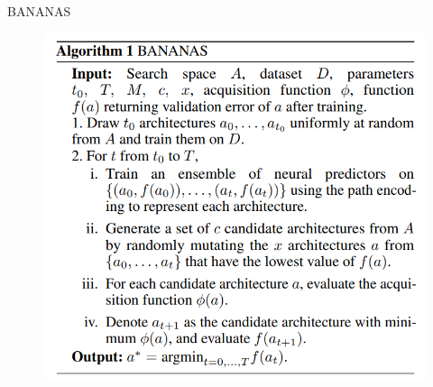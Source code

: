 \documentclass{beamer}
\begin{document}
\begin{frame}{BANANAS}
\centering 


\begin{figure}
        \centering
        \includegraphics[scale=0.7]{images/bananas1.png}
    \end{figure}
 
\end{frame}
\end{document}
